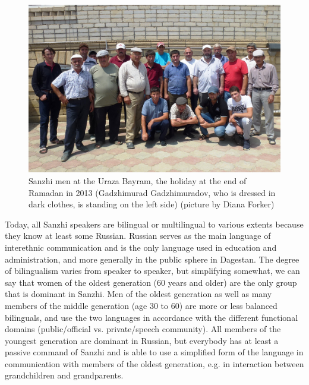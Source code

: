 \begin{figure}
	\caption{Sanzhi men at the Uraza Bayram, the holiday at the end of Ramadan in 2013 (Gadzhimurad Gadzhimuradov, who is dressed in dark clothes, is standing on the left side) (picture by Diana Forker)}
	\label{fig:SanzhiPeople}
	\includegraphics[scale=0.4]{figures/8_uraza2013.png}
\end{figure}

Today, all Sanzhi speakers are bilingual or multilingual to various extents because they know at least some Russian. Russian serves as the main language of interethnic communication and is the only language used in education and administration, and more generally in the public sphere in Dagestan. The degree of bilingualism varies from speaker to speaker, but simplifying somewhat, we can say that women of the oldest generation (60 years and older) are the only group that is dominant in Sanzhi. Men of the oldest generation as well as many members of the middle generation (age 30 to 60) are more or less balanced bilinguals, and use the two languages in accordance with the different functional domains (public/official vs. private/speech community). All members of the youngest generation are dominant in Russian, but everybody has at least a passive command of Sanzhi and is able to use a simplified form of the language in communication with members of the oldest generation, e.g. in interaction between grandchildren and grandparents.

